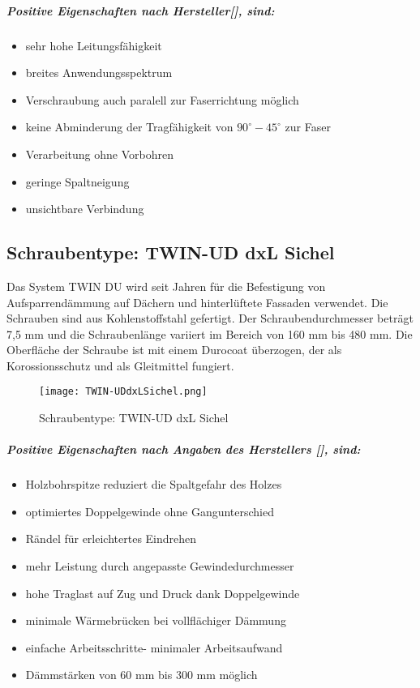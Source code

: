 \documentclass[12 pt,a4 paper ]{scrreprt}
\begin{document}
\subparagraph{Positive Eigenschaften nach Hersteller[], sind:}

\begin{itemize}
	\item sehr hohe Leitungsfähigkeit
	\item breites Anwendungsspektrum
	\item Verschraubung auch paralell zur Faserrichtung möglich
	\item keine Abminderung der Tragfähigkeit von $90^\circ  -  45^\circ$ zur Faser
	\item Verarbeitung ohne Vorbohren
	\item geringe Spaltneigung
	\item unsichtbare Verbindung
\end{itemize}


\subsection{Schraubentype: TWIN-UD dxL Sichel }
Das System TWIN DU wird seit Jahren für die Befestigung von Aufsparrendämmung auf Dächern  und hinterlüftete Fassaden verwendet. Die Schrauben sind aus Kohlenstoffstahl gefertigt. Der Schraubendurchmesser beträgt 7,5 mm  und die Schraubenlänge variiert im Bereich von 160 mm bis 480 mm. Die Oberfläche der Schraube ist mit einem Durocoat überzogen, der als Korossionsschutz und als Gleitmittel fungiert.

\begin{figure}[h]
\begin{center}
\texttt{[image: TWIN-UDdxLSichel.png]}
\caption{Schraubentype: TWIN-UD dxL Sichel}
\end{center}
\end{figure}


\subparagraph{Positive Eigenschaften nach Angaben des Herstellers [], sind:}

\begin{itemize}
	\item Holzbohrspitze reduziert die Spaltgefahr des 	Holzes
	\item optimiertes Doppelgewinde ohne		 Gangunterschied
	\item Rändel für erleichtertes Eindrehen
	\item mehr Leistung durch angepasste 	Gewindedurchmesser
	\item hohe Traglast auf Zug und Druck dank 	Doppelgewinde
	\item minimale Wärmebrücken bei vollflächiger 	Dämmung
	\item einfache Arbeitsschritte- minimaler 	Arbeitsaufwand
	\item Dämmstärken von 60 mm bis 300 mm möglich
\end{itemize}
\end{document}
